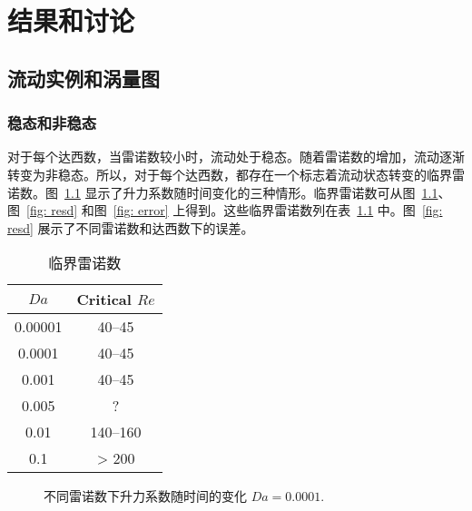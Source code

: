 \chapter{结果和讨论}

\section{流动实例和涡量图}

\subsection{稳态和非稳态}

对于每个达西数，当雷诺数较小时，流动处于稳态。随着雷诺数的增加，流动逐渐转变为非稳态。所以，对于每个达西数，都存在一个标志着流动状态转变的临界雷诺数。图~\ref{fig: Cl_t} 显示了升力系数随时间变化的三种情形。临界雷诺数可从图~\ref{fig: Cl_t}、图~\ref{fig: resd} 和图~\ref{fig: error} 上得到。这些临界雷诺数列在表~\ref{tab: critical Re} 中。图~\ref{fig: resd} 展示了不同雷诺数和达西数下的误差。

\begin{table}
	\caption{临界雷诺数}\label{tab: critical Re}
	\vspace{.5em}\centering\wuhao
	\begin{tabular}{cc}
		\toprule[1.5pt]
		$Da$ & Critical $Re$ \\
		\midrule[1pt]
		0.00001 & 40--45 \\
		0.0001  & 40--45 \\
		0.001   & 40--45 \\
		0.005   & ? \\
		0.01    & 140--160 \\
		0.1     & > 200 \\
	\bottomrule[1.5pt]
	\end{tabular}
\end{table}

\begin{figure}
	\setlength{\subfigcapskip}{-1bp}
	\centering
	\begin{minipage}{\textwidth}
		\centering
	\end{minipage}
	\centering
	\begin{minipage}{\textwidth}
		\centering
	\end{minipage}
	\vspace{0.2em}
	\caption{不同雷诺数下升力系数随时间的变化 $Da=0.0001$.}
	\label{fig: Cl_t}
\end{figure}

